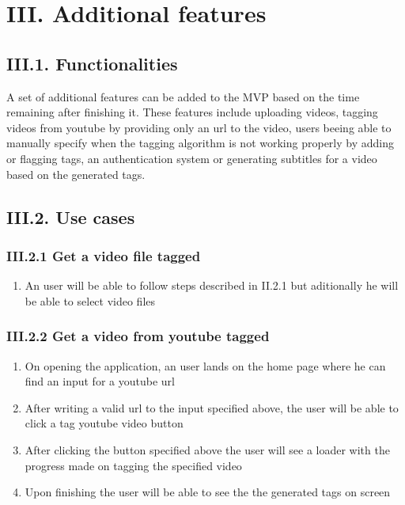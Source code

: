 \documentclass[11pt, a4papper]{report}
\theoremstyle{plain}
\theoremstyle{definition}
\theoremstyle{definition}
\theoremstyle{proposition}
\begin{document}
\chapter*{III. Additional features}

\section*{III.1. Functionalities}
A set of additional features can be added to the MVP based on the time remaining after finishing it. These features include uploading videos, tagging videos from youtube by providing only an url to the video, users beeing able to manually specify when the tagging algorithm is not working properly by adding or flagging tags, an authentication system or generating subtitles for a video based on the generated tags.

\section*{III.2. Use cases}

\subsection*{III.2.1 Get a video file tagged}

\begin{enumerate}
	\item{An user will be able to follow steps described in II.2.1 but aditionally he will be able to select video files}
\end{enumerate}

\subsection*{III.2.2 Get a video from youtube tagged}

\begin{enumerate}
	\item{On opening the application, an user lands on the home page where he can find an input for a youtube url}
	\item{After writing a valid url to the input specified above, the user will be able to click a tag youtube video button}
	\item{After clicking the button specified above the user will see a loader with the progress made on tagging the specified video}
	\item{Upon finishing the user will be able to see the the generated tags on screen}
\end{enumerate}
\end{document}
